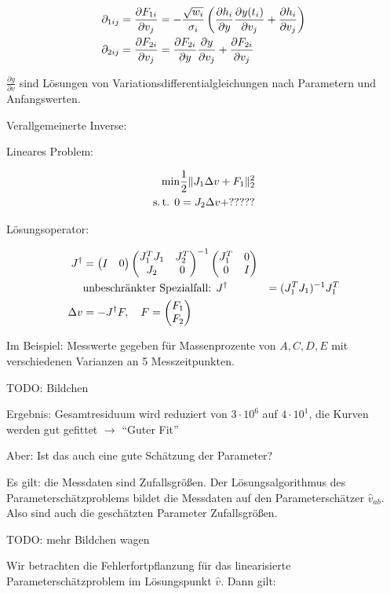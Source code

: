 \begin{align*}
\partial_{1ij} &= \frac{\partial F_{1i}}{\partial v_j} = - \frac{\sqrt{w_i}}{\sigma_i} \left( \frac{\partial h_i}{\partial y} \frac{\partial y(t_i)}{\partial v_j} + \frac{\partial h_i}{\partial v_j} \right) \\
\partial_{2ij} &= \frac{\partial F_{2i}}{\partial v_j} = \frac{\partial F_{2i}}{\partial y} \frac{\partial y}{\partial v_j} + \frac{\partial F_{2i}}{\partial v_j} \\
\end{align*}

$\frac{\partial y}{\partial v}$ sind Lösungen von Variationsdifferentialgleichungen nach Parametern und Anfangswerten.

Verallgemeinerte Inverse:

Lineares Problem:

\begin{align*}
\min &\frac 12 \|J_1 \Delta v + F_1\|_2^2 \\
\text{s.\,t. } 0 &= J_2 \Delta v + ?????
\end{align*}

Lösungsoperator:

\begin{align*}
J^\dagger &= \begin{pmatrix} I & 0 \end{pmatrix} \begin{pmatrix} J_1^T J_1 & J_2^T \\ J_2 & 0 \end{pmatrix}^{-1} \begin{pmatrix} J_1^T & 0 \\ 0 & I \end{pmatrix} \\
&\text{unbeschränkter Spezialfall: } J^\dagger &= (J_1^T J_1)^{-1} J_1^T \\
\Delta v &= -J^\dagger F, \quad F = \begin{pmatrix} F_1 \\ F_2 \end{pmatrix}
\end{align*}

Im Beispiel: Messwerte gegeben für Massenprozente von $A,C,D,E$ mit verschiedenen Varianzen an 5 Messzeitpunkten.

TODO: Bildchen

Ergebnis: Gesamtresiduum wird reduziert von $3\cdot 10^6$ auf $4\cdot 10^1$, die Kurven werden gut gefittet $\to$ "`Guter Fit"'

Aber: Ist das auch eine gute Schätzung der Parameter?

Es gilt: die Messdaten sind Zufallsgrößen. Der Lösungsalgorithmus des Parameterschätzproblems bildet die Messdaten auf den Parameterschätzer $\hat v_{ab}$. Also sind auch die geschätzten Parameter Zufallsgrößen.

TODO: mehr Bildchen wagen

Wir betrachten die Fehlerfortpflanzung für das linearisierte Parameterschätzproblem im Lösungspunkt $\hat v$. Dann gilt:

